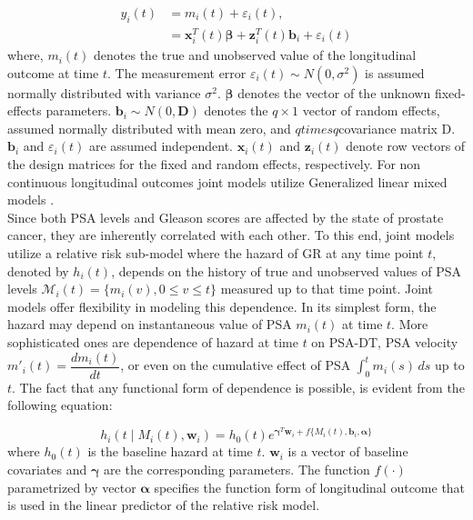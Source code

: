 \begin{equation*}
\begin{split}
y_i(t) &= m_i(t) + \varepsilon_i(t), \\
&= \boldsymbol{x}_i^T(t) \boldsymbol{\beta} + \boldsymbol{z}_i^T(t) \boldsymbol{b}_i + \varepsilon_i(t)
\end{split}
\end{equation*}
where, $m_i(t)$ denotes the true and unobserved value of the longitudinal outcome at time $t$. The measurement error $\varepsilon_i(t) \sim N(0, \sigma^2)$ is assumed normally distributed with variance $\sigma^2$. $\boldsymbol{\beta}$ denotes the vector of the unknown fixed-effects parameters. $\boldsymbol{b}_i \sim N(0, \boldsymbol{D})$ denotes the $q \times 1$ vector of random effects, assumed normally distributed with mean zero, and $q times q$covariance matrix D. $\boldsymbol{b}_i$ and $\varepsilon_i(t)$ are assumed independent. $\boldsymbol{x}_i(t)$ and $\boldsymbol{z}_i(t)$ denote row vectors of the design matrices for the fixed and random effects, respectively. For non continuous longitudinal outcomes joint models utilize Generalized linear mixed models \citep{rizopoulos2012joint}.\\

Since both PSA levels and Gleason scores are affected by the state of prostate cancer, they are inherently correlated with each other. To this end, joint models utilize a relative risk sub-model where the hazard of GR at any time point $t$, denoted by $h_i(t)$, depends on the history of true and unobserved values of PSA levels $\mathcal{M}_i(t) = \{m_i(v), 0\leq v \leq t\}$ measured up to that time point. Joint models offer flexibility in modeling this dependence. In its simplest form, the hazard may depend on instantaneous value of PSA $m_i(t)$ at time $t$. More sophisticated ones are dependence of hazard at time $t$ on PSA-DT, PSA velocity $m'_i(t) = \dfrac{d m_i(t)}{dt}$, or even on the cumulative effect of PSA $\int_0^t m_i(s) \,ds$ up to $t$. The fact that any functional form of dependence is possible, is evident from the following equation:

\begin{equation*}
h_i(t \mid M_i(t), \boldsymbol{w}_i) = h_0(t) e^{\boldsymbol{\gamma}^T\boldsymbol{w}_i + f\{M_i(t), \boldsymbol{b}_i, \boldsymbol{\alpha}\}}
\end{equation*}
where $h_0(t)$ is the baseline hazard at time $t$. $\boldsymbol{w}_i$ is a vector of baseline covariates and $\boldsymbol{\gamma}$ are the corresponding parameters. The function $f(\cdot)$ parametrized by vector $\boldsymbol{\alpha}$ specifies the function form of longitudinal outcome that is used in the linear predictor of the relative risk model.\\

